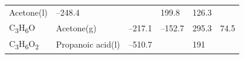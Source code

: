 \documentclass[
  9pt,
]{extbook}
\theoremstyle{definition}
\theoremstyle{definition}
\theoremstyle{definition}
\theoremstyle{remark}
\begin{document}
\begin{longtable}[]{@{}llllll@{}}
\begin{minipage}[t]{0.17\columnwidth}
Acetone(l)\strut
\end{minipage} & \begin{minipage}[t]{0.15\columnwidth}\raggedright
--248.4\strut
\end{minipage} & \begin{minipage}[t]{0.15\columnwidth}\raggedright
\strut
\end{minipage} & \begin{minipage}[t]{0.14\columnwidth}\raggedright
199.8\strut
\end{minipage} & \begin{minipage}[t]{0.14\columnwidth}\raggedright
126.3\strut
\end{minipage}\tabularnewline
\begin{minipage}[t]{0.07\columnwidth}\raggedright
C\textsubscript{3}H\textsubscript{6}O\strut
\end{minipage} & \begin{minipage}[t]{0.17\columnwidth}\raggedright
Acetone(g)\strut
\end{minipage} & \begin{minipage}[t]{0.15\columnwidth}\raggedright
--217.1\strut
\end{minipage} & \begin{minipage}[t]{0.15\columnwidth}\raggedright
--152.7\strut
\end{minipage} & \begin{minipage}[t]{0.14\columnwidth}\raggedright
295.3\strut
\end{minipage} & \begin{minipage}[t]{0.14\columnwidth}\raggedright
74.5\strut
\end{minipage}\tabularnewline
\begin{minipage}[t]{0.07\columnwidth}\raggedright
C\textsubscript{3}H\textsubscript{6}O\textsubscript{2}\strut
\end{minipage} & \begin{minipage}[t]{0.17\columnwidth}\raggedright
Propanoic acid(l)\strut
\end{minipage} & \begin{minipage}[t]{0.15\columnwidth}\raggedright
--510.7\strut
\end{minipage} & \begin{minipage}[t]{0.15\columnwidth}\raggedright
\strut
\end{minipage} & \begin{minipage}[t]{0.14\columnwidth}\raggedright
191\strut
\end{minipage} & \begin{minipage}[t]{0.14\columnwidth}\raggedright

\end{minipage}
\end{longtable}
\end{document}
